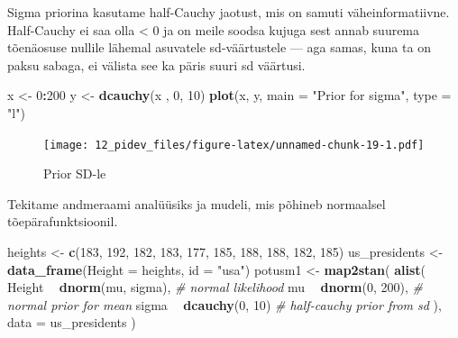 \documentclass[]{book}
\newenvironment{Shaded}{\begin{snugshade}}{\end{snugshade}}
\newcommand{\KeywordTok}[1]{\textcolor[rgb]{0.13,0.29,0.53}{\textbf{#1}}}
\newcommand{\DataTypeTok}[1]{\textcolor[rgb]{0.13,0.29,0.53}{#1}}
\newcommand{\DecValTok}[1]{\textcolor[rgb]{0.00,0.00,0.81}{#1}}
\newcommand{\StringTok}[1]{\textcolor[rgb]{0.31,0.60,0.02}{#1}}
\newcommand{\CommentTok}[1]{\textcolor[rgb]{0.56,0.35,0.01}{\textit{#1}}}
\newcommand{\OperatorTok}[1]{\textcolor[rgb]{0.81,0.36,0.00}{\textbf{#1}}}
\newcommand{\NormalTok}[1]{#1}
\begin{document}
Sigma priorina kasutame half-Cauchy jaotust, mis on samuti
väheinformatiivne. Half-Cauchy ei saa olla \textless{} 0 ja on meile
soodsa kujuga sest annab suurema tõenäosuse nullile lähemal asuvatele
sd-väärtustele --- aga samas, kuna ta on paksu sabaga, ei välista see ka
päris suuri sd väärtusi.

\begin{Shaded}
\begin{Highlighting}[]
\NormalTok{x <-}\StringTok{ }\DecValTok{0}\OperatorTok{:}\DecValTok{200}
\NormalTok{y <-}\StringTok{ }\KeywordTok{dcauchy}\NormalTok{(x , }\DecValTok{0}\NormalTok{, }\DecValTok{10}\NormalTok{)}
\KeywordTok{plot}\NormalTok{(x, y, }\DataTypeTok{main =} \StringTok{"Prior for sigma"}\NormalTok{, }\DataTypeTok{type =} \StringTok{"l"}\NormalTok{)}
\end{Highlighting}
\end{Shaded}

\begin{figure}
\centering
\texttt{[image: 12\_pidev\_files/figure-latex/unnamed-chunk-19-1.pdf]}
\caption{\label{fig:unnamed-chunk-19}Prior SD-le}
\end{figure}

Tekitame andmeraami analüüsiks ja mudeli, mis põhineb normaalsel
tõepärafunktsioonil.

\begin{Shaded}
\begin{Highlighting}[]
\NormalTok{heights <-}\StringTok{ }\KeywordTok{c}\NormalTok{(}\DecValTok{183}\NormalTok{, }\DecValTok{192}\NormalTok{, }\DecValTok{182}\NormalTok{, }\DecValTok{183}\NormalTok{, }\DecValTok{177}\NormalTok{, }\DecValTok{185}\NormalTok{, }\DecValTok{188}\NormalTok{, }\DecValTok{188}\NormalTok{, }\DecValTok{182}\NormalTok{, }\DecValTok{185}\NormalTok{)}
\NormalTok{us_presidents <-}\StringTok{ }\KeywordTok{data_frame}\NormalTok{(}\DataTypeTok{Height =}\NormalTok{ heights, }\DataTypeTok{id =} \StringTok{"usa"}\NormalTok{)}
\NormalTok{potusm1 <-}\StringTok{ }\KeywordTok{map2stan}\NormalTok{(}
  \KeywordTok{alist}\NormalTok{(}
\NormalTok{    Height }\OperatorTok{~}\StringTok{ }\KeywordTok{dnorm}\NormalTok{(mu, sigma), }\CommentTok{# normal likelihood}
\NormalTok{    mu }\OperatorTok{~}\StringTok{ }\KeywordTok{dnorm}\NormalTok{(}\DecValTok{0}\NormalTok{, }\DecValTok{200}\NormalTok{), }\CommentTok{# normal prior for mean}
\NormalTok{    sigma }\OperatorTok{~}\StringTok{ }\KeywordTok{dcauchy}\NormalTok{(}\DecValTok{0}\NormalTok{, }\DecValTok{10}\NormalTok{) }\CommentTok{# half-cauchy prior from sd }
\NormalTok{  ), }\DataTypeTok{data =}\NormalTok{ us_presidents}
\NormalTok{)}
\end{Highlighting}
\end{Shaded}
\end{document}
